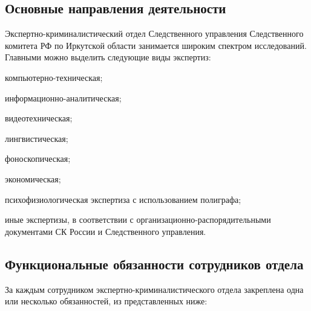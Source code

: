 \subsection{Основные направления деятельности}

Экспертно-криминалистический отдел Следственного управления Следственного комитета РФ по Иркутской области занимается широким спектром исследований. Главными можно выделить следующие виды экспертиз:

\begin{enumerate*}
	\item компьютерно-техническая;
	\item информационно-аналитическая;
	\item видеотехническая;
	\item лингвистическая;
	\item фоноскопическая;
	\item экономическая;
	\item психофизиологическая экспертиза с использованием полиграфа;
	\item иные экспертизы, в соответствии с организационно-распорядительными документами СК России и Следственного управления.
\end{enumerate*}

\subsection{Функциональные обязанности сотрудников отдела}

За каждым сотрудником экспертно-криминалистического отдела закреплена одна или несколько обязанностей, из представленных ниже:

